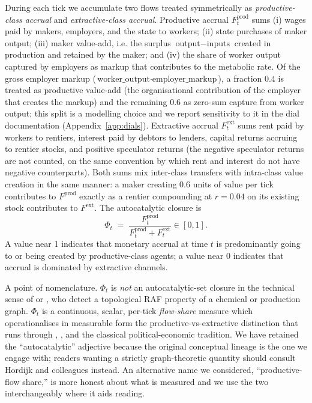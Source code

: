 \documentclass[11pt]{article}
\begin{document}
During each tick we accumulate two flows treated symmetrically as
\emph{productive-class accrual} and \emph{extractive-class accrual}.
Productive accrual $F^\text{prod}_t$ sums (i) wages paid by makers,
employers, and the state to workers; (ii) state purchases of maker
output; (iii) maker value-add, i.e. the surplus $\text{output} -
\text{inputs}$ created in production and retained by the maker; and
(iv) the share of worker output captured by employers as markup that
contributes to the metabolic rate. Of the gross employer markup
($\text{worker\_output} \cdot \text{employer\_markup}$), a fraction
$0.4$ is treated as productive value-add (the organisational
contribution of the employer that creates the markup) and the
remaining $0.6$ as zero-sum capture from worker output; this
split is a modelling choice and we report sensitivity to it in
the dial documentation (Appendix~\ref{app:dials}).
Extractive accrual $F^\text{ext}_t$
sums rent paid by workers to rentiers, interest paid by debtors to
lenders, capital returns accruing to rentier stocks, and positive
speculator returns (the negative speculator returns are not
counted, on the same convention by which rent and interest do not
have negative counterparts). Both sums
mix inter-class transfers with intra-class value creation in the same
manner: a maker creating $0.6$ units of value per tick contributes to
$F^\text{prod}$ exactly as a rentier compounding at $r=0.04$ on its
existing stock contributes to $F^\text{ext}$. The autocatalytic
closure is
\begin{equation}
\Phi_t \;=\; \frac{F^\text{prod}_t}{F^\text{prod}_t + F^\text{ext}_t} \in [0,1].
\end{equation}
A value near 1 indicates that monetary accrual at time $t$ is
predominantly going to or being created by productive-class agents; a
value near 0 indicates that accrual is dominated by extractive
channels.

A point of nomenclature. $\Phi_t$ is
\emph{not} an autocatalytic-set closure in the technical sense of
\citet{kauffman1988evolution} or \citet{hordijk2004detecting}, who
detect a topological RAF property of a chemical or production graph.
$\Phi_t$ is a continuous, scalar, per-tick \emph{flow-share} measure
which operationalises in measurable form the
productive-vs-extractive distinction that runs through
\citet{kauffman1988evolution}, \citet{mazzucato2018value}, and the
classical political-economic tradition. We have retained the
``autocatalytic'' adjective because the original conceptual lineage is
the one we engage with; readers wanting a strictly graph-theoretic
quantity should consult Hordijk and colleagues instead. An alternative
name we considered, ``productive-flow share,'' is more honest about
what is measured and we use the two interchangeably where it aids
reading.
\end{document}
